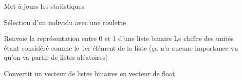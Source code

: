 \documentclass[letterpaper,10pt,french]{sphinxmanual}
\begin{document}
\begin{fulllineitems}
\begin{fulllineitems}
\end{fulllineitems}


\begin{fulllineitems}
\label{\detokenize{index:ag_optimizer.AGOptimizer.updateStats}}
Met à jours les statistiques

\end{fulllineitems}


\begin{fulllineitems}
\label{\detokenize{index:ag_optimizer.AGOptimizer.wheelSelection}}
Sélection d’un individu avec une roulette

\end{fulllineitems}


\end{fulllineitems}


\begin{fulllineitems}
\label{\detokenize{index:ag_optimizer.binToFloat}}
Renvoie la représentation entre 0 et 1 d’une liste binaire 
Le chiffre des unités étant considéré comme le 1er élément de la liste
(ça n’a aucune importance vu qu’on va partir de listes aléatoires)

\end{fulllineitems}


\begin{fulllineitems}
\label{\detokenize{index:ag_optimizer.binVectorToFloat}}
Convertit un vecteur de listes binaires en vecteur de float

\end{fulllineitems}


\begin{fulllineitems}
\label{\detokenize{index:ag_optimizer.getrandbits}}
\end{fulllineitems}
\end{document}
